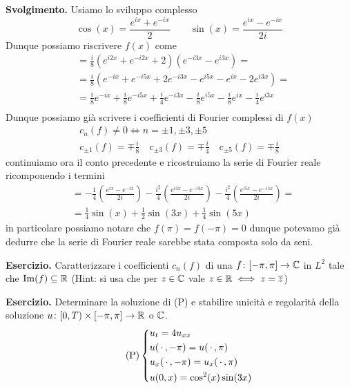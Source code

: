 \textbf{Svolgimento.}
Usiamo lo sviluppo complesso
$$
\cos(x) = \frac{e^{ix} + e^{-ix}}{2}
\qquad
\sin(x) = \frac{e^{ix} - e^{-ix}}{2i}
$$
Dunque possiamo riscrivere $f(x)$ come
$$
\begin{aligned}
	&= \frac{i}{8} \left( e^{i2x} + e^{-i2x} + 2 \right) \left( e^{-i3x} - e^{i3x} \right) = \\
	&= \frac{i}{8} \left( e^{-ix} + e^{-i5x} + 2e^{-i3x} - e^{i5x} - e^{ix} - 2e^{i3x} \right) = \\
	&= \frac{i}{8} e^{-ix} + \frac{i}{8} e^{-i5x} + \frac{i}{4} e^{-i3x} - \frac{i}{8} e^{i5x} - \frac{i}{8} e^{ix} - \frac{i}{4} e^{i3x} \\
\end{aligned}
$$
Dunque possiamo già scrivere i coefficienti di Fourier complessi di $f(x)$
$$
\begin{gathered}
	c_n(f) \neq 0 \iff n = \pm 1, \pm 3, \pm 5 \\
	c_{\pm 1}(f) = \mp\frac{i}{8}  
	\quad
	c_{\pm 3}(f) = \mp\frac{i}{4}
	\quad
	c_{\pm 5}(f) = \mp\frac{i}{8}
\end{gathered}
$$
continuiamo ora il conto precedente e ricostruiamo la serie di Fourier reale ricomponendo i termini
$$
\begin{aligned}
	&= -\frac{1}{4}\left( \frac{e^{ix} - e^{-ix}}{2i} \right) -\frac{i^2}{4}\left( \frac{e^{i3x} - e^{-i3x}}{2i} \right) -\frac{i^2}{4}\left( \frac{e^{i5x} - e^{-i5x}}{2i} \right) = \\
	&= \frac{1}{4} \sin(x) + \frac{1}{2} \sin(3x) + \frac{1}{4} \sin(5x)
\end{aligned}
$$
in particolare possiamo notare che $f(\pi) = f(-\pi) = 0$ dunque potevamo già dedurre che la serie di Fourier reale sarebbe stata composta solo da seni.

\textbf{Esercizio.}
Caratterizzare i coefficienti $c_n(f)$ di una $f \colon [-\pi, \pi] \to \mathbb C$ in $L^2$ tale che $\operatorname{Im}(f) \subseteq \mathbb R$ (Hint: si usa che per $z \in \mathbb C$ vale $z \in \mathbb R \iff z = \overline z$)

\textbf{Esercizio.}
Determinare la soluzione di (P) e stabilire unicità e regolarità della soluzione $u \colon [0, T) \times [-\pi, \pi] \to \mathbb R$ o $\mathbb C$.
\begin{equation}
	\tag{P}
	\left\{
	\begin{aligned}
		& u_t = 4 u_{xx} \\
		& u(\,\cdot\,, -\pi) = u(\,\cdot\,, \pi) \\
		& u_x(\,\cdot\,, -\pi) = u_x(\,\cdot\,, \pi) \\
		& u(0, x) = \cos^2(x) \sin(3x)
	\end{aligned}
	\right.
\end{equation}

